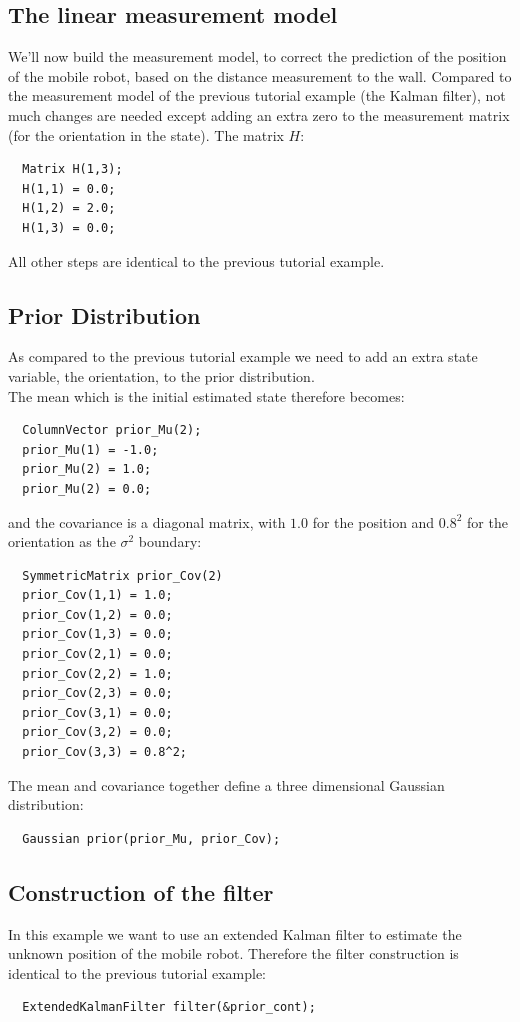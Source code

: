 \documentclass[a4paper,10pt]{report}
\begin{document}
\subsection{The linear measurement model}
We'll now build the measurement model, to correct the prediction of
the position of the mobile robot, based on the distance measurement to
the wall.  Compared to the measurement model of the previous tutorial
example (the Kalman filter), not much changes are needed except adding
an extra zero to the measurement matrix (for the orientation in the
state). The matrix ${H}$:
\begin{verbatim}
  Matrix H(1,3);
  H(1,1) = 0.0;
  H(1,2) = 2.0;
  H(1,3) = 0.0;
\end{verbatim}
All other steps are identical to the previous tutorial example.



\subsection{Prior Distribution}
As compared to the previous tutorial example we need to add an extra
state variable, the orientation, to the prior distribution.\\
The mean which is the initial estimated state therefore becomes:
\begin{verbatim}
  ColumnVector prior_Mu(2);
  prior_Mu(1) = -1.0;
  prior_Mu(2) = 1.0;
  prior_Mu(2) = 0.0;
\end{verbatim}
and the covariance is a diagonal matrix, with $1.0$ for the position
and $0.8^2$ for the orientation as the $\sigma^2$ boundary:
\begin{verbatim}
  SymmetricMatrix prior_Cov(2)
  prior_Cov(1,1) = 1.0;
  prior_Cov(1,2) = 0.0;
  prior_Cov(1,3) = 0.0;
  prior_Cov(2,1) = 0.0;
  prior_Cov(2,2) = 1.0;
  prior_Cov(2,3) = 0.0;
  prior_Cov(3,1) = 0.0;
  prior_Cov(3,2) = 0.0;
  prior_Cov(3,3) = 0.8^2;
\end{verbatim}
The mean and covariance together define a three dimensional Gaussian
distribution:
\begin{verbatim}
  Gaussian prior(prior_Mu, prior_Cov);
\end{verbatim}



\subsection{Construction of the filter}
In this example we want to use an extended Kalman filter to estimate
the unknown position of the mobile robot. Therefore the filter
construction is identical to the previous tutorial example:
\begin{verbatim}
  ExtendedKalmanFilter filter(&prior_cont);
\end{verbatim}
\end{document}
